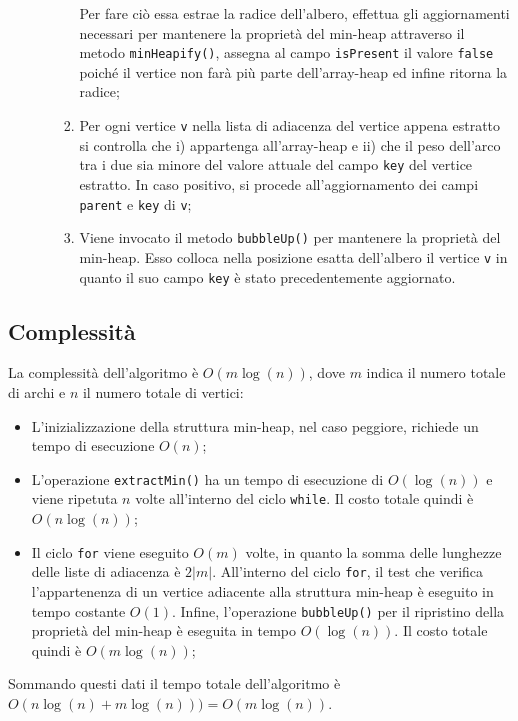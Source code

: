 \begin{itemize}
\begin{enumerate}
\begin{enumerate}
			Per fare ciò essa estrae la radice dell'albero, effettua gli aggiornamenti necessari per mantenere la proprietà del min-heap attraverso il metodo \texttt{minHeapify()}, assegna al campo \texttt{isPresent} il valore \texttt{false} poiché il vertice non farà più parte dell'array-heap ed infine ritorna la radice;
			\item Per ogni vertice \texttt{v} nella lista di adiacenza del vertice appena estratto si controlla che i) appartenga all'array-heap e ii) che il peso dell'arco tra i due sia minore del valore attuale del campo \texttt{key} del vertice estratto. 
			In caso positivo, si procede all'aggiornamento dei campi \texttt{parent} e \texttt{key} di \texttt{v};
			\item Viene invocato il metodo \texttt{bubbleUp()} per mantenere la proprietà del min-heap. 
			Esso colloca nella posizione esatta dell'albero il vertice \texttt{v} in quanto il suo campo \texttt{key} è stato precedentemente aggiornato.
		\end{enumerate} 
	\end{enumerate}
\end{itemize}

\subsection{Complessità}
	La complessità dell'algoritmo è $O(m\log(n))$, dove $m$ indica il numero totale di archi e $n$ il numero totale di vertici:
	\begin{itemize}
		\item L'inizializzazione della struttura min-heap, nel caso peggiore, richiede un tempo di esecuzione $O(n)$;
		\item L'operazione \texttt{extractMin()} ha un tempo di esecuzione di $O(\log(n))$ e viene ripetuta $n$ volte all'interno del ciclo \texttt{while}. Il costo totale quindi è $O(n\log(n))$;
		\item Il ciclo \texttt{for} viene eseguito $O(m)$ volte, in quanto la somma delle lunghezze delle liste di adiacenza è $2|m|$. All'interno del ciclo \texttt{for}, il test che verifica l'appartenenza di un vertice adiacente alla struttura min-heap è eseguito in tempo costante $O(1)$. 
		Infine, l'operazione \texttt{bubbleUp()} per il ripristino della proprietà del min-heap è eseguita in tempo $O(\log(n))$. 
		Il costo totale quindi è $O(m\log(n))$;
	\end{itemize}
	Sommando questi dati il tempo totale dell'algoritmo è $O(n\log(n) + m\log(n))) = O(m\log(n))$.
	
\pagebreak